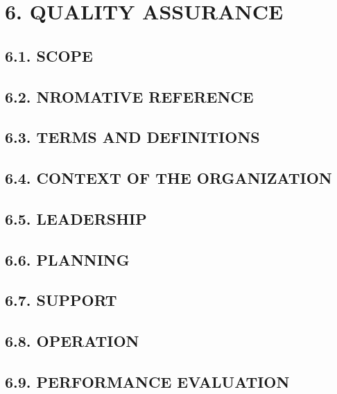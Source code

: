 \documentclass[
]{article}
\begin{document}
\hypertarget{quality-assurance}{%
\section{6. QUALITY ASSURANCE}\label{quality-assurance}}

\hypertarget{scope}{%
\subsection{6.1. SCOPE}\label{scope}}

\hypertarget{nromative-reference}{%
\subsection{6.2. NROMATIVE REFERENCE}\label{nromative-reference}}

\hypertarget{terms-and-definitions}{%
\subsection{6.3. TERMS AND DEFINITIONS}\label{terms-and-definitions}}

\hypertarget{context-of-the-organization}{%
\subsection{6.4. CONTEXT OF THE
ORGANIZATION}\label{context-of-the-organization}}

\hypertarget{leadership}{%
\subsection{6.5. LEADERSHIP}\label{leadership}}

\hypertarget{planning}{%
\subsection{6.6. PLANNING}\label{planning}}

\hypertarget{support}{%
\subsection{6.7. SUPPORT}\label{support}}

\hypertarget{operation}{%
\subsection{6.8. OPERATION}\label{operation}}

\hypertarget{performance-evaluation}{%
\subsection{6.9. PERFORMANCE EVALUATION}\label{performance-evaluation}}
\end{document}
